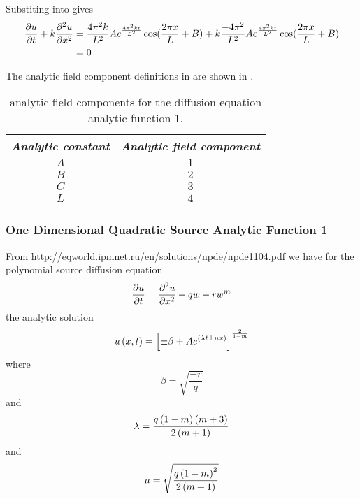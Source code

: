 Substiting  into  gives
\begin{align}
   \dfrac{\partial u}{\partial t} +k \dfrac{\partial^{2} u}{\partial {x}^{2}}  &=
  \dfrac{4\pi^{2}k}{L^{2}}Ae^{\frac{4\pi^{2}kt}{L^{2}}}\cos(\frac{2\pi x}{L}
  + B) +
  k\dfrac{-4\pi^{2}}{L^{2}}Ae^{\frac{4\pi^{2}kt}{L^{2}}}\cos(\frac{2\pi x}{L}
  + B) \\
  &= 0
\end{align}

The analytic field component definitions in \OpenCMISS are shown in .

\begin{table}[htb] \centering
  \begin{tabular}{|c|c|} \hline
    \emph{Analytic constant} & \emph{Analytic field component} \\ \hline \hline
    $A$ & $1$ \\ 
    $B$ & $2$ \\
    $C$ & $3$ \\
    $L$ & $4$ \\ \hline
  \end{tabular}
  \caption{\OpenCMISS analytic field components for the \oned diffusion equation
    analytic function 1.}
  \label{tab:OpenCMISSAnalyticFieldDiffusionEquationOneDim1}
\end{table}

\subsubsection{One Dimensional Quadratic Source Analytic Function 1}

From \url{http://eqworld.ipmnet.ru/en/solutions/npde/npde1104.pdf} we have for
the \oned polynomial source diffusion equation
\begin{equation}
   \dfrac{\partial u}{\partial t} = \dfrac{\partial^{2} u}{\partial {x}^{2}} +qw+rw^{m}
\end{equation}
the analytic solution
\begin{equation}
   u\left( x,t \right) =\left[ \pm\beta+Ae^{\left( \lambda t \pm\mu x \right)} \right]^\frac{2}{1-m}
\end{equation}
where
\begin{equation}
  \beta=\sqrt{\dfrac{-r}{q}}
\end{equation}
and
\begin{equation}
  \lambda=\dfrac{q\left( 1-m \right)\left( m+3 \right)}{2\left( m+1 \right)}
\end{equation}
and 
\begin{equation}
  \mu=\sqrt{\dfrac{q\left( 1-m \right)^{2}}{2\left( m+1 \right)}}
\end{equation}

